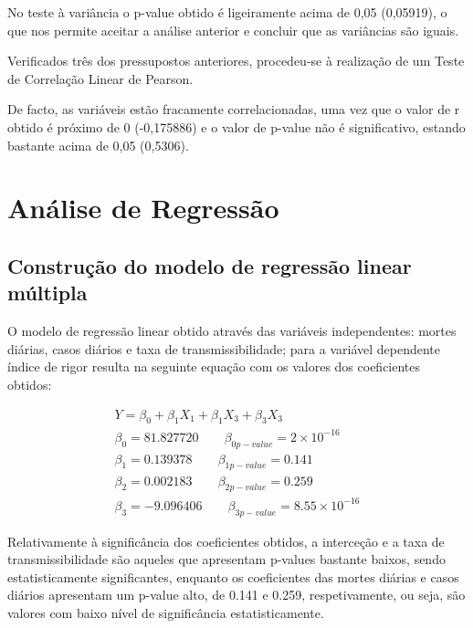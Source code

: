 \documentclass[conference]{IEEEtran}
\begin{document}
No teste à variância o p-value obtido é ligeiramente acima de 0,05 (0,05919), o que nos permite aceitar a análise anterior e concluir que as variâncias são iguais.


Verificados três dos pressupostos anteriores, procedeu-se à realização de um Teste de Correlação Linear de Pearson.

De facto, as variáveis estão fracamente correlacionadas, uma vez que o valor de r obtido é próximo de 0 (-0,175886) e o valor de p-value não é significativo, estando bastante acima de 0,05 (0,5306).


\section{Análise de Regressão} %

\subsection{Construção do modelo de regressão linear múltipla}

O modelo de regressão linear obtido através das variáveis independentes: mortes diárias, casos diários e taxa de transmissibilidade; para a variável dependente índice de rigor resulta na seguinte equação com os valores dos coeficientes obtidos:

\begin{equation}
\begin{array}{l}
	Y=\beta _{0}+\beta _{1}X_{1}+\beta _{1}X_{3}+\beta _{3}X_{3} \\
	\beta _{0}=81.827720 \qquad \beta _{0 p-value}=2\times 10^{-16} \\
	\beta _{1}=0.139378 \qquad \beta _{1 p-value}=0.141 \\
	\beta _{2}=0.002183 \qquad \beta _{2 p-value}=0.259 \\
	\beta _{3}=-9.096406 \qquad \beta _{3 p-value}=8.55\times 10^{-16}
\end{array}
\end{equation}

Relativamente à significância dos coeficientes obtidos, a interceção e a taxa de transmissibilidade são aqueles que apresentam p-values bastante baixos, sendo estatisticamente significantes, enquanto os coeficientes das mortes diárias e casos diários apresentam um p-value alto, de 0.141 e 0.259, respetivamente, ou seja, são valores com baixo nível de significância estatisticamente.
\end{document}

